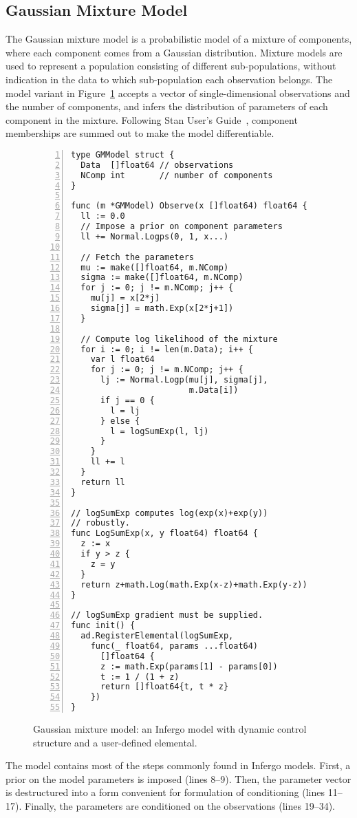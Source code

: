 \documentclass[sigplan,screen]{acmart}
\begin{document}
\begin{sloppypar}
\subsection{Gaussian Mixture Model}
\label{sec:gaussian-mixture}

The Gaussian mixture model is a probabilistic model of a mixture
of components, where each component comes from a Gaussian
distribution. Mixture models are used to represent a population
consisting of different sub-populations, without indication in
the data to which sub-population each observation belongs. The
model variant in Figure~\ref{fig:gaussian-mixture} accepts a
vector of single-dimensional observations and the number of
components, and infers the distribution of parameters of each
component in the mixture. Following Stan User's
Guide~\cite{SDT18}, component memberships are summed out to make
the model differentiable.
\begin{figure}
\begin{lstlisting}[xleftmargin=11pt,framexleftmargin=10pt,numbers=left]
type GMModel struct {
  Data  []float64 // observations
  NComp int       // number of components
}

func (m *GMModel) Observe(x []float64) float64 {
  ll := 0.0
  // Impose a prior on component parameters
  ll += Normal.Logps(0, 1, x...)

  // Fetch the parameters
  mu := make([]float64, m.NComp)
  sigma := make([]float64, m.NComp)
  for j := 0; j != m.NComp; j++ {
    mu[j] = x[2*j]
    sigma[j] = math.Exp(x[2*j+1])
  }

  // Compute log likelihood of the mixture
  for i := 0; i != len(m.Data); i++ {
    var l float64
    for j := 0; j != m.NComp; j++ {
      lj := Normal.Logp(mu[j], sigma[j],
                        m.Data[i])
      if j == 0 {
        l = lj
      } else {
        l = logSumExp(l, lj)
      }
    }
    ll += l
  }
  return ll
}

// logSumExp computes log(exp(x)+exp(y))
// robustly.
func LogSumExp(x, y float64) float64 {
  z := x
  if y > z {
    z = y
  }
  return z+math.Log(math.Exp(x-z)+math.Exp(y-z))
}

// logSumExp gradient must be supplied.
func init() {
  ad.RegisterElemental(logSumExp,
    func(_ float64, params ...float64)
      []float64 {
      z := math.Exp(params[1] - params[0])
      t := 1 / (1 + z)
      return []float64{t, t * z}
    })
}
\end{lstlisting}
\caption{Gaussian mixture model: an Infergo model with
  dynamic control structure and a user-defined elemental.}
\label{fig:gaussian-mixture}
\end{figure}
The model contains most of the steps commonly found in Infergo
models. First, a prior on the model parameters is imposed (lines
8--9). Then, the parameter vector is destructured into a form
convenient for formulation of conditioning (lines 11--17).
Finally, the parameters are conditioned on the observations
(lines 19--34).


\end{sloppypar}
\end{document}

